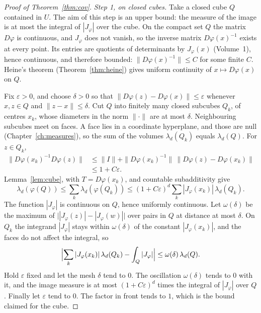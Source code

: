 \begin{proof}[Proof of Theorem~\ref{thm:cov}]
\emph{Step 1, on closed cubes.} Take a closed cube $Q$ contained in $U$. The aim of this step is an upper bound: the measure of the image is at most the integral of $|J_\varphi|$ over the cube. On the compact set $Q$ the matrix $D\varphi$ is continuous, and $J_\varphi$ does not vanish, so the inverse matrix $D\varphi(x)^{-1}$ exists at every point. Its entries are quotients of determinants by $J_\varphi(x)$ (Volume~1), hence continuous, and therefore bounded: $\|D\varphi(x)^{-1}\|\le C$ for some finite $C$. Heine's theorem (Theorem~\ref{thm:heine}) gives uniform continuity of $x\mapsto D\varphi(x)$ on $Q$.

Fix $\varepsilon>0$, and choose $\delta>0$ so that $\|D\varphi(z)-D\varphi(x)\|\le\varepsilon$ whenever $x,z\in Q$ and $\|z-x\|\le\delta$. Cut $Q$ into finitely many closed subcubes $Q_k$, of centres $x_k$, whose diameters in the norm $\|\cdot\|$ are at most $\delta$. Neighbouring subcubes meet on faces. A face lies in a coordinate hyperplane, and those are null (Chapter~\ref{ch:measures}), so the sum of the volumes $\lambda_d(Q_k)$ equals $\lambda_d(Q)$. For $z\in Q_k$,
\begin{align*}
\|D\varphi(x_k)^{-1}D\varphi(z)\|
&\le\|I\|+\|D\varphi(x_k)^{-1}\|\,\|D\varphi(z)-D\varphi(x_k)\|\\
&\le 1+C\varepsilon.
\end{align*}
Lemma~\ref{lem:cube}, with $T=D\varphi(x_k)$, and countable subadditivity give
\[
\lambda_d(\varphi(Q))\le\sum_k\lambda_d(\varphi(Q_k))\le(1+C\varepsilon)^d\sum_k|J_\varphi(x_k)|\,\lambda_d(Q_k).
\]
The function $|J_\varphi|$ is continuous on $Q$, hence uniformly continuous. Let $\omega(\delta)$ be the maximum of $\bigl||J_\varphi(z)|-|J_\varphi(w)|\bigr|$ over pairs in $Q$ at distance at most $\delta$. On $Q_k$ the integrand $|J_\varphi|$ stays within $\omega(\delta)$ of the constant $|J_\varphi(x_k)|$, and the faces do not affect the integral, so
\[
\Bigl|\sum_k|J_\varphi(x_k)|\,\lambda_d(Q_k)-\int_Q|J_\varphi|\Bigr|\le\omega(\delta)\,\lambda_d(Q).
\]
Hold $\varepsilon$ fixed and let the mesh $\delta$ tend to $0$. The oscillation $\omega(\delta)$ tends to $0$ with it, and the image measure is at most $(1+C\varepsilon)^d$ times the integral of $|J_\varphi|$ over $Q$. Finally let $\varepsilon$ tend to $0$. The factor in front tends to $1$, which is the bound claimed for the cube.


\end{proof}
